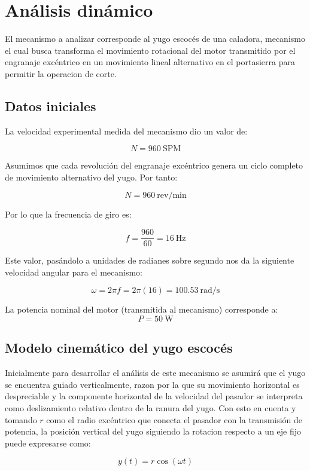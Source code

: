 \documentclass[12pt,letterpaper]{article}
\begin{document}
\section{Análisis dinámico}

El mecanismo a analizar corresponde al yugo escocés de una caladora, mecanismo el cual busca transforma el movimiento rotacional del motor transmitido por el engranaje excéntrico en un movimiento lineal alternativo en el portasierra para permitir la operacion de corte.
 
\subsection{Datos iniciales}


La velocidad experimental medida del mecanismo dio un valor de:

\[
N = 960 \ \text{SPM}
\]

Asumimos que cada revolución del engranaje excéntrico genera un ciclo completo de movimiento alternativo del yugo. Por tanto:

\[
N = 960 \ \text{rev/min}
\]

Por lo que la frecuencia de giro es:

\[
f = \frac{960}{60}=16 \ \text{Hz}
\]

Este valor, pasándolo a unidades de radianes sobre segundo nos da la siguiente velocidad angular para el mecanismo:

\[
\omega = 2\pi f = 2\pi(16)=100.53 \ \text{rad/s}
\]

La potencia nominal del motor (transmitida al mecanismo) corresponde a:
\[
P = 50 \ \text{W}
\]

\subsection{Modelo cinemático del yugo escocés}

Inicialmente para desarrollar el análisis de este mecanismo se asumirá que el yugo se encuentra guiado verticalmente, razon por la que su movimiento horizontal es despreciable y la componente horizontal de la velocidad del pasador se interpreta como deslizamiento relativo dentro de la ranura del yugo.
Con esto en cuenta y tomando \(r\) como el radio excéntrico que conecta el pasador con la transmisión de potencia, la posición vertical del yugo siguiendo la rotacion respecto a un eje fijo puede expresarse como:

\[
y(t)=r\cos(\omega t)
\]
\end{document}
